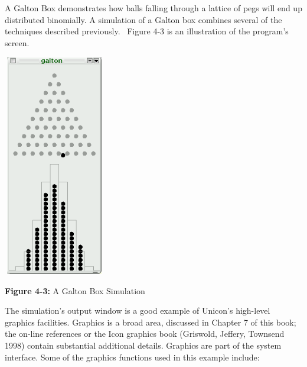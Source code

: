 A Galton Box demonstrates how balls falling through a
lattice of pegs will end up distributed binomially. A simulation of a
Galton box combines several of the techniques described previously.
\ Figure 4-3 is an illustration of the program's
screen.
\begin{center}
\includegraphics[width=1.75in,height=3.8201in]{ub-img/ub-img10.png}
\end{center}

{\sffamily\bfseries Figure 4-3:}
{\sffamily A Galton Box Simulation}

\bigskip

The simulation's output window is a good example of
Unicon's high-level graphics facilities. Graphics is a
broad area, discussed in Chapter 7 of this book; the on-line references
or the Icon graphics book (Griswold, Jeffery, Townsend 1998) contain
substantial additional details. Graphics are part of the system
interface. Some of the graphics functions used in this example include:


